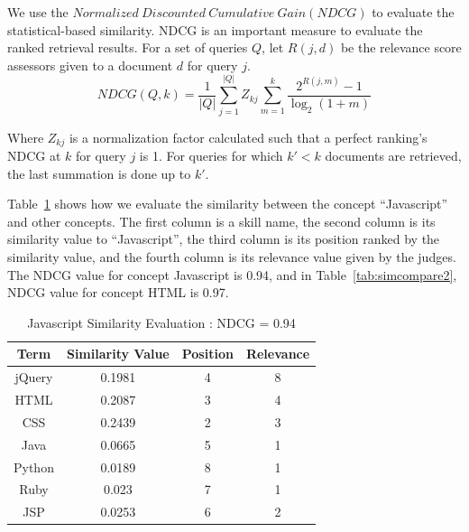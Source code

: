We use the $ Normalized~Discounted~Cumulative~Gain ( NDCG )$ to evaluate the statistical-based similarity. NDCG is an important measure to evaluate the ranked retrieval results. For a set of queries $Q$, let $R(j,d)$ be the relevance score assessors given to a document $d$ for query $j$.
       $$ NDCG(Q,k) = \frac {1}{|Q|} \sum_{j=1}^{|Q|}{Z_{kj}} \sum_{m=1}^{k} \frac{2^{R(j,m)} - 1}{ \log_2(1+m)} $$

Where $Z_{kj}$ is a normalization factor calculated such that a perfect ranking's NDCG at $k$ for query $j$ is 1. For queries for which $k' < k$ documents are retrieved, the last summation is done up to $k'$.

Table~\ref{tab:simcompare1} shows how we evaluate the similarity between the concept ``Javascript'' and other concepts. The first column is a skill name, the second column is its similarity value to ``Javascript'', the third column is its position ranked by the similarity value, and the fourth column is its relevance value given by the judges. The NDCG value for concept Javascript is 0.94, and in Table~\ref{tab:simcompare2},  NDCG value for concept HTML is 0.97.

\begin{table}
\centering
\caption{ Javascript Similarity Evaluation : NDCG = 0.94 }
\begin{tabular}{ | c | c | c  | c |  }
 \hline
    Term     &  Similarity Value  &  Position   & Relevance     \\  \hline
    jQuery   &  0.1981            &      4      &   8        \\
     HTML    &  0.2087            &      3      &   4         \\
     CSS     &  0.2439            &      2      &   3   \\
     Java    &  0.0665            &      5      &   1   \\
    Python   &  0.0189            &      8      &   1   \\
     Ruby    &  0.023             &      7      &   1    \\
     JSP     &  0.0253            &      6      &   2    \\
 \hline
\end{tabular}
\label{tab:simcompare1}
\end{table}


